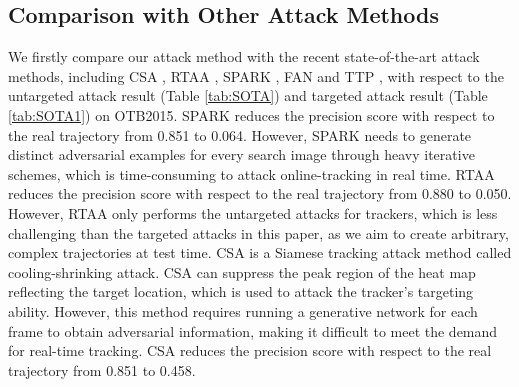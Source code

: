 \documentclass[journal]{IEEEtran}
\begin{document}
\subsection{Comparison with Other Attack Methods}


We firstly compare our attack method with the recent state-of-the-art attack methods, including CSA \cite{CSA}, RTAA \cite{RTAA}, SPARK \cite{SPARK}, FAN \cite{FAN} and TTP \cite{TTP}, with respect to the untargeted attack result (Table \ref{tab:SOTA}) and targeted attack result (Table \ref{tab:SOTA1}) on OTB2015.
SPARK \cite{SPARK} reduces the precision score with respect to the real trajectory from 0.851 to 0.064. However, SPARK needs to generate distinct adversarial examples for every search image through heavy iterative schemes, which is time-consuming to attack online-tracking in real time.
RTAA \cite{RTAA} reduces the precision score with respect to the real trajectory from 0.880 to 0.050. However, RTAA only performs the untargeted attacks for trackers, which is less challenging than the targeted attacks in this paper, as we aim to create arbitrary, complex trajectories at test time. 
CSA \cite{CSA} is a Siamese tracking attack method called cooling-shrinking attack. CSA can suppress the peak region of the heat map reflecting the target location, which is used to attack the tracker's targeting ability.
However, this method requires running a generative network for each frame to obtain adversarial information, making it difficult to meet the demand for real-time tracking. CSA reduces the precision score with respect to the real trajectory from 0.851 to 0.458.
\end{document}
